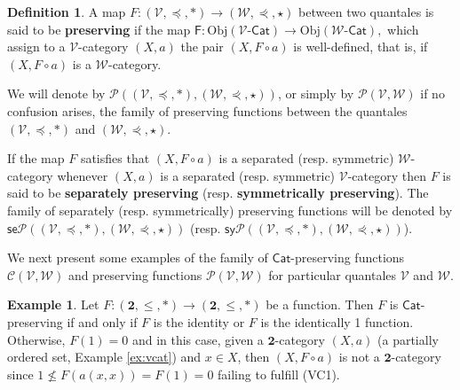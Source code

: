 \documentclass[11pt,a4paper]{amsart}
\theoremstyle{definition}
\newtheorem{definition}[theorem]{Definition}
\newtheorem{example}[theorem]{Example}
\begin{document}
	\begin{definition}\label{def:preserving}
		A map $F:(\mathscr{V},\preceq,\ast)\to(\mathscr{W},\curlyeqprec,\star)$ between two quantales is said to be \textbf{preserving} if the map $\mathsf{F}:\mathrm{Obj}(\mathscr{V}\text{-}\mathsf{Cat})\to\mathrm{Obj}(\mathscr{W}\text{-}\mathsf{Cat}),$ which assign to a $\mathscr{V}$-category $(X,a)$ the pair $(X,F\circ a)$ is well-defined, that is, if $(X,F\circ a)$ is a $\mathscr{W}$-category.
		
		We will denote by $\mathscr{P}((\mathscr{V},\preceq,\ast),(\mathscr{W},\curlyeqprec,\star))$, or simply by $\mathscr{P}(\mathscr{V},\mathscr{W})$ if no confusion arises, the family of preserving functions between the quantales $(\mathscr{V},\preceq,\ast)$ and $(\mathscr{W},\curlyeqprec,\star).$
		
		If the map $F$ satisfies that $(X,F\circ a)$ is a separated (resp. symmetric) $\mathscr{W}$-category whenever $(X,a)$ is a separated (resp. symmetric) $\mathscr{V}$-category then $F$ is said to be \textbf{separately preserving} (resp. \textbf{symmetrically preserving}).  The family of separately (resp. symmetrically) preserving functions will be denoted by $\mathsf{se}\mathscr{P}((\mathscr{V},\preceq,\ast),(\mathscr{W},\curlyeqprec,\star))$ (resp. $\mathsf{sy}\mathscr{P}((\mathscr{V},\preceq,\ast),(\mathscr{W},\curlyeqprec,\star))$).
	\end{definition}
	
	We next present some examples of the family of $\mathsf{Cat}$-preserving functions $\mathscr{C}(\mathscr{V},\mathscr{W})$ and preserving functions $\mathscr{P}(\mathscr{V},\mathscr{W})$ for particular quantales $\mathscr{V}$ and $\mathscr{W}.$
	
	\begin{example}
		Let $F:(\mathbf{2},\leq,\ast)\to (\mathbf{2},\leq,\ast)$ be a function. Then $F$ is $\mathsf{Cat}$-preserving if and only if $F$ is the identity or $F$ is the identically 1 function. Otherwise, $F(1)=0$ and in this case, given a $\mathbf{2}$-category $(X,a)$ (a partially ordered set, Example \ref{ex:vcat})  and $x\in X$, then $(X,F\circ a)$ is not a $\mathbf{2}$-category since $1\not\leq F(a(x,x))=F(1)=0$ failing to fulfill (VC1).
	\end{example}
	
\end{document}
